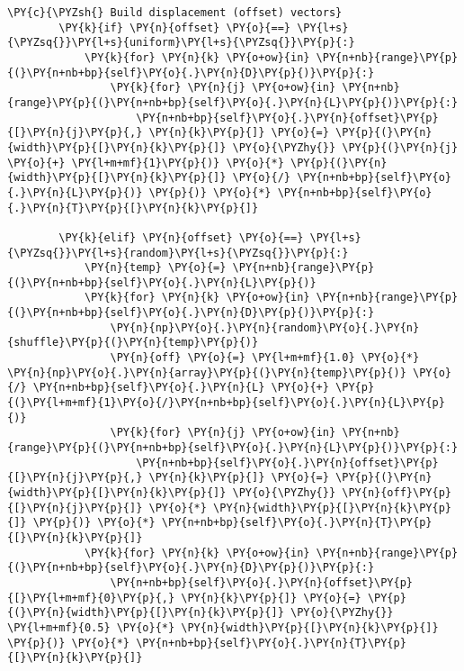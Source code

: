 \begin{Verbatim}[commandchars=\\\{\}]
        \PY{c}{\PYZsh{} Build displacement (offset) vectors}
        \PY{k}{if} \PY{n}{offset} \PY{o}{==} \PY{l+s}{\PYZsq{}}\PY{l+s}{uniform}\PY{l+s}{\PYZsq{}}\PY{p}{:}
            \PY{k}{for} \PY{n}{k} \PY{o+ow}{in} \PY{n+nb}{range}\PY{p}{(}\PY{n+nb+bp}{self}\PY{o}{.}\PY{n}{D}\PY{p}{)}\PY{p}{:}
                \PY{k}{for} \PY{n}{j} \PY{o+ow}{in} \PY{n+nb}{range}\PY{p}{(}\PY{n+nb+bp}{self}\PY{o}{.}\PY{n}{L}\PY{p}{)}\PY{p}{:}
                    \PY{n+nb+bp}{self}\PY{o}{.}\PY{n}{offset}\PY{p}{[}\PY{n}{j}\PY{p}{,} \PY{n}{k}\PY{p}{]} \PY{o}{=} \PY{p}{(}\PY{n}{width}\PY{p}{[}\PY{n}{k}\PY{p}{]} \PY{o}{\PYZhy{}} \PY{p}{(}\PY{n}{j} \PY{o}{+} \PY{l+m+mf}{1}\PY{p}{)} \PY{o}{*} \PY{p}{(}\PY{n}{width}\PY{p}{[}\PY{n}{k}\PY{p}{]} \PY{o}{/} \PY{n+nb+bp}{self}\PY{o}{.}\PY{n}{L}\PY{p}{)} \PY{p}{)} \PY{o}{*} \PY{n+nb+bp}{self}\PY{o}{.}\PY{n}{T}\PY{p}{[}\PY{n}{k}\PY{p}{]}
        
        \PY{k}{elif} \PY{n}{offset} \PY{o}{==} \PY{l+s}{\PYZsq{}}\PY{l+s}{random}\PY{l+s}{\PYZsq{}}\PY{p}{:}
            \PY{n}{temp} \PY{o}{=} \PY{n+nb}{range}\PY{p}{(}\PY{n+nb+bp}{self}\PY{o}{.}\PY{n}{L}\PY{p}{)}
            \PY{k}{for} \PY{n}{k} \PY{o+ow}{in} \PY{n+nb}{range}\PY{p}{(}\PY{n+nb+bp}{self}\PY{o}{.}\PY{n}{D}\PY{p}{)}\PY{p}{:}
                \PY{n}{np}\PY{o}{.}\PY{n}{random}\PY{o}{.}\PY{n}{shuffle}\PY{p}{(}\PY{n}{temp}\PY{p}{)}
                \PY{n}{off} \PY{o}{=} \PY{l+m+mf}{1.0} \PY{o}{*} \PY{n}{np}\PY{o}{.}\PY{n}{array}\PY{p}{(}\PY{n}{temp}\PY{p}{)} \PY{o}{/} \PY{n+nb+bp}{self}\PY{o}{.}\PY{n}{L} \PY{o}{+} \PY{p}{(}\PY{l+m+mf}{1}\PY{o}{/}\PY{n+nb+bp}{self}\PY{o}{.}\PY{n}{L}\PY{p}{)}
                \PY{k}{for} \PY{n}{j} \PY{o+ow}{in} \PY{n+nb}{range}\PY{p}{(}\PY{n+nb+bp}{self}\PY{o}{.}\PY{n}{L}\PY{p}{)}\PY{p}{:}
                    \PY{n+nb+bp}{self}\PY{o}{.}\PY{n}{offset}\PY{p}{[}\PY{n}{j}\PY{p}{,} \PY{n}{k}\PY{p}{]} \PY{o}{=} \PY{p}{(}\PY{n}{width}\PY{p}{[}\PY{n}{k}\PY{p}{]} \PY{o}{\PYZhy{}} \PY{n}{off}\PY{p}{[}\PY{n}{j}\PY{p}{]} \PY{o}{*} \PY{n}{width}\PY{p}{[}\PY{n}{k}\PY{p}{]} \PY{p}{)} \PY{o}{*} \PY{n+nb+bp}{self}\PY{o}{.}\PY{n}{T}\PY{p}{[}\PY{n}{k}\PY{p}{]}
            \PY{k}{for} \PY{n}{k} \PY{o+ow}{in} \PY{n+nb}{range}\PY{p}{(}\PY{n+nb+bp}{self}\PY{o}{.}\PY{n}{D}\PY{p}{)}\PY{p}{:}
                \PY{n+nb+bp}{self}\PY{o}{.}\PY{n}{offset}\PY{p}{[}\PY{l+m+mf}{0}\PY{p}{,} \PY{n}{k}\PY{p}{]} \PY{o}{=} \PY{p}{(}\PY{n}{width}\PY{p}{[}\PY{n}{k}\PY{p}{]} \PY{o}{\PYZhy{}} \PY{l+m+mf}{0.5} \PY{o}{*} \PY{n}{width}\PY{p}{[}\PY{n}{k}\PY{p}{]} \PY{p}{)} \PY{o}{*} \PY{n+nb+bp}{self}\PY{o}{.}\PY{n}{T}\PY{p}{[}\PY{n}{k}\PY{p}{]}
        

\end{Verbatim}
